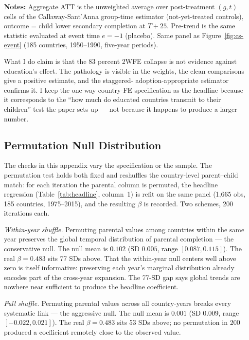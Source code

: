 \documentclass[12pt,letterpaper]{article}
\begin{document}
{\begin{minipage}{\dimexpr\textwidth-2em}
\scriptsize
\textbf{Notes:} Aggregate ATT is the unweighted average over
post-treatment $(g,t)$ cells of the Callaway-Sant'Anna group-time
estimator (not-yet-treated controls), outcome = child lower
secondary completion at $T{+}25$. Pre-trend is the same statistic
evaluated at event time $e{=}{-}1$ (placebo). Same panel as
Figure~\ref{fig:cs-event} (185 countries, 1950--1990, five-year
periods).
\end{minipage}

What I do claim is that the 83 percent 2WFE collapse is not evidence
against education's effect. The pathology is visible in the weights,
the clean comparisons give a positive estimate, and the staggered-
adoption-appropriate estimator confirms it. I keep the one-way
country-FE specification as the headline because it corresponds to
the ``how much do educated countries transmit to their children'' test
the paper sets up --- not because it happens to produce a larger
number.


\subsection{Permutation Null Distribution}\label{appendix-permutation}

The checks in this appendix vary the specification or the sample. The
permutation test holds both fixed and reshuffles the country-level
parent--child match: for each iteration the parental column is permuted,
the headline regression (Table~\ref{tab:headline}, column~1) is refit on the
same panel (1{,}665 obs, 185 countries, 1975--2015), and the resulting
$\beta$ is recorded. Two schemes, 200 iterations each.

\emph{Within-year shuffle.} Permuting parental values among countries
within the same year preserves the global temporal distribution of
parental completion --- the conservative null. The null mean is
$0.102$ (SD $0.005$, range $[0.087, 0.115]$). The real $\beta=0.483$
sits 77 SDs above. That the within-year null centers well above zero
is itself informative: preserving each year's marginal distribution
already encodes part of the cross-year expansion. The 77-SD gap says
global trends are nowhere near sufficient to produce the headline
coefficient.

\emph{Full shuffle.} Permuting parental values across all country-years
breaks every systematic link --- the aggressive null. The null mean is
$0.001$ (SD $0.009$, range $[-0.022, 0.021]$). The real $\beta=0.483$
sits 53 SDs above; no permutation in 200 produced a coefficient
remotely close to the observed value.

}
\end{document}
